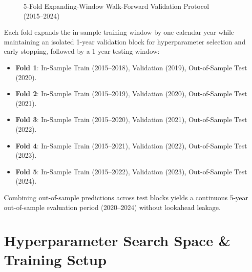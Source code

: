 \begin{figure}[htbp]
{%
}
\caption{5-Fold Expanding-Window Walk-Forward Validation Protocol (2015--2024)}
\label{fig:ch3_walk_forward_scheme}
\end{figure}

Each fold expands the in-sample training window by one calendar year while maintaining an isolated 1-year validation block for hyperparameter selection and early stopping, followed by a 1-year testing window:
\begin{itemize}
    \item \textbf{Fold 1}: In-Sample Train (2015--2018), Validation (2019), Out-of-Sample Test (2020).
    \item \textbf{Fold 2}: In-Sample Train (2015--2019), Validation (2020), Out-of-Sample Test (2021).
    \item \textbf{Fold 3}: In-Sample Train (2015--2020), Validation (2021), Out-of-Sample Test (2022).
    \item \textbf{Fold 4}: In-Sample Train (2015--2021), Validation (2022), Out-of-Sample Test (2023).
    \item \textbf{Fold 5}: In-Sample Train (2015--2022), Validation (2023), Out-of-Sample Test (2024).
\end{itemize}

Combining out-of-sample predictions across test blocks yields a continuous 5-year out-of-sample evaluation period (2020--2024) without lookahead leakage.

\section{Hyperparameter Search Space \& Training Setup}
\label{sec:ch3_hyperparameters}

